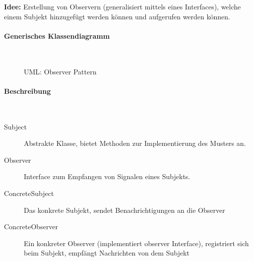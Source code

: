 \documentclass[ngerman,color=3b]{tuda_summary}
\begin{document}
\textbf{Idee:} Erstellung von Observern (generalisiert mittels eines Interfaces), welche einem Subjekt hinzugefügt werden können und aufgerufen werden können.

\paragraph{Generisches Klassendiagramm}\mbox{}\\
\begin{figure}[ht]
    \centering
    \caption{UML: Observer Pattern}
\end{figure}

\paragraph{Beschreibung}\mbox{}\\
\begin{description}
    \item[Subject] Abstrakte Klasse, bietet Methoden zur Implementierung des Musters an.
    \item[Observer] Interface zum Empfangen von Signalen eines Subjekts.
    \item[ConcreteSubject] Das konkrete Subjekt, sendet Benachrichtigungen an die Observer
    \item[ConcreteObserver] Ein konkreter Observer (implementiert observer Interface), registriert sich beim Subjekt, empfängt Nachrichten von dem Subjekt
\end{description}
\end{document}
